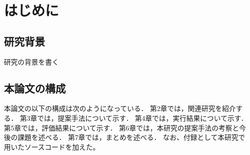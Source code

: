 \chapter{はじめに}
\thispagestyle{fancy}
\setcounter{page}{1}
\renewcommand{\thepage}{\arabic{page}}

\section{研究背景}
研究の背景を書く


\section{本論文の構成}
本論文の以下の構成は次のようになっている．
第2章では，関連研究を紹介する．
第3章では，提案手法について示す．
第4章では，実行結果について示す．
第5章では，評価結果について示す．
第6章では，本研究の提案手法の考察と今後の課題を述べる．
第7章では，まとめを述べる．
なお、付録として本研究で用いたソースコードを加えた。
